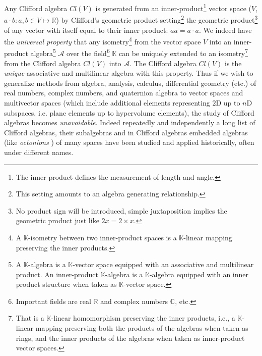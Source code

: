 \documentclass[cameraready]{jcmsi}%
\newcommand{\R}{\mathbb{R}}
\begin{document}
Any Clifford algebra $Cl(V)$ is generated from an inner-product\footnote{The inner product defines the measurement of length and angle.} vector space ($V$, $a\cdot b: a,b \in V \mapsto \R$)
by Clifford's geometric product setting\footnote{This setting amounts to an algebra generating relationship.} the geometric product\footnote{No product sign will be introduced, simple juxtaposition implies the geometric product just like $2x = 2 \times x$.} of any vector with itself equal to their inner product: $aa = a\cdot a$. We indeed have the \textit{universal property} \cite{HL:IAandGR,IP:CACG} that any isometry\footnote{
A $\mathbb{K}$-isometry between two inner-product spaces is a $\mathbb{K}$-linear mapping preserving the inner products. 
} 
from the vector space $V$ into an inner-product algebra\footnote{
A $\mathbb{K}$-algebra is a $\mathbb{K}$-vector space equipped with an associative and multilinear product.
An inner-product $\mathbb{K}$-algebra is a $\mathbb{K}$-algebra equipped with an inner product structure when taken as $\mathbb{K}$-vector space.
} 
$\mathcal{A}$ over the field\footnote{Important fields are real  $\mathbb{R}$ and complex numbers $\mathbb{C}$, etc. } $\mathbb{K}$ can be uniquely extended to an isometry\footnote{
That is a $\mathbb{K}$-linear homomorphism preserving the inner products, i.e., a $\mathbb{K}$-linear mapping
preserving both the products of the algebras when taken as rings,
and the inner products of the algebras when taken as inner-product vector spaces.} 
from the Clifford algebra $Cl(V)$ into $\mathcal{A}$. The Clifford algebra $Cl(V)$ is the \textit{unique} associative and multilinear algebra with this property. 
Thus if we wish to generalize methods from algebra, analysis, calculus, differential geometry (etc.) of real numbers, complex numbers, and quaternion algebra to vector spaces and multivector spaces (which include additional elements representing $2$D up to $n$D subspaces, i.e. plane elements up to hypervolume elements), the study of Clifford algebras becomes \textit{unavoidable}. Indeed repeatedly and independently a long list of Clifford algebras, their subalgebras and in Clifford algebras embedded algebras (like \textit{octonions} \cite{PL:CAandSpin}) of many spaces have been studied and applied historically, often under different names.
\end{document}
